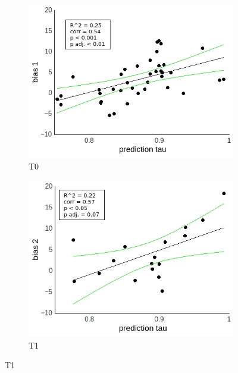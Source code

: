 \documentclass[a4paper]{scrreprt}
\begin{document}
\begin{figure}
\centering
\begin{subfigure}[b]{0.49\textwidth}
        \includegraphics[width=\textwidth]{figs/sec3/pred/predno_diff_1_mod1dat.jpeg}
        \caption{T0}
    \end{subfigure}
    \begin{subfigure}[b]{0.49\textwidth}
        \includegraphics[width=\textwidth]{figs/sec3/pred/predno_diff_2_mod1dat.jpeg}
        \caption{T1}
    \end{subfigure}


\end{figure}
\end{document}
